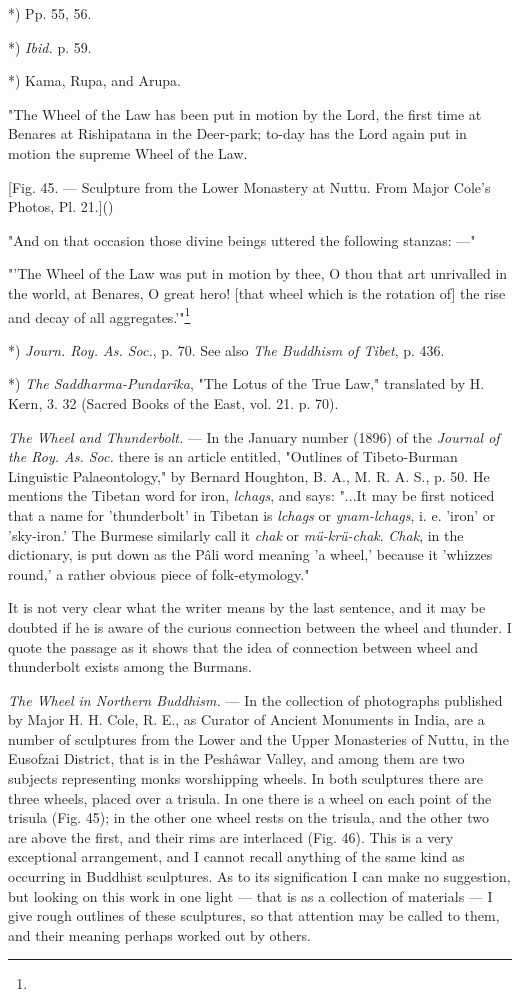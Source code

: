 \documentclass[a4paper, 11pt, oneside, polutonikogreek, english]{article}
\begin{document}
*) Pp. 55, 56.

*) \emph{Ibid.} p. 59.

*) Kama, Rupa, and Arupa.

"The Wheel of the Law has been put in motion by the Lord, the first time at Benares at Rishipatana in the Deer-park; to-day has the Lord again put in motion the supreme Wheel of the Law.

[Fig. 45. --- Sculpture from the Lower Monastery at Nuttu. From Major Cole's Photos, Pl. 21.]()

"And on that occasion those divine beings uttered the following stanzas: ---"

"'The Wheel of the Law was put in motion by thee, O thou that art unrivalled in the world, at Benares, O great hero! [that wheel which is the rotation of] the rise and decay of all aggregates.'"\footnote{}

*) \emph{Journ. Roy. As. Soc.}, p. 70. See also \emph{The Buddhism of Tibet}, p. 436.

*) \emph{The Saddharma-Pundarîka}, "The Lotus of the True Law," translated by H. Kern, 3. 32 (Sacred Books of the East, vol. 21. p. 70).

\emph{The Wheel and Thunderbolt.} --- In the January number (1896) of the \emph{Journal of the Roy. As. Soc.} there is an article entitled, "Outlines of Tibeto-Burman Linguistic Palaeontology," by Bernard Houghton, B. A., M. R. A. S., p. 50. He mentions the Tibetan word for iron, \emph{lchags}, and says: "...It may be first noticed that a name for 'thunderbolt' in Tibetan is \emph{lchags} or \emph{ynam-lchags}, i. e. 'iron' or 'sky-iron.' The Burmese similarly call it \emph{chak} or \emph{mü-krü-chak}. \emph{Chak}, in the dictionary, is put down as the Pâli word meaning 'a wheel,' because it 'whizzes round,' a rather obvious piece of folk-etymology."

It is not very clear what the writer means by the last sentence, and it may be doubted if he is aware of the curious connection between the wheel and thunder. I quote the passage as it shows that the idea of connection between wheel and thunderbolt exists among the Burmans.

\emph{The Wheel in Northern Buddhism.} --- In the collection of photographs published by Major H. H. Cole, R. E., as Curator of Ancient Monuments in India, are a number of sculptures from the Lower and the Upper Monasteries of Nuttu, in the Eusofzai District, that is in the Peshâwar Valley, and among them are two subjects representing monks worshipping wheels. In both sculptures there are three wheels, placed over a trisula. In one there is a wheel on each point of the trisula (Fig. 45); in the other one wheel rests on the trisula, and the other two are above the first, and their rims are interlaced (Fig. 46). This is a very exceptional arrangement, and I cannot recall anything of the same kind as occurring in Buddhist sculptures. As to its signification I can make no suggestion, but looking on this work in one light --- that is as a collection of materials --- I give rough outlines of these sculptures, so that attention may be called to them, and their meaning perhaps worked out by others.
\end{document}
